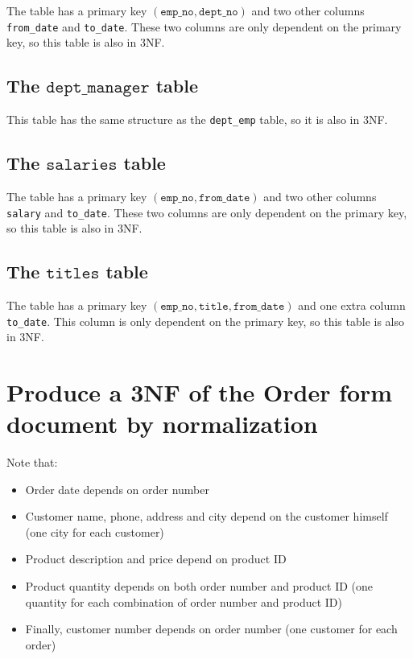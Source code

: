 \documentclass[12pt]{article}
\begin{document}
The table has a primary key $(\texttt{emp\_no}, \texttt{dept\_no})$ and two other columns \verb|from_date| and \verb|to_date|. These two columns are only dependent on the primary key, so this table is also in 3NF.

\subsection{The $\texttt{dept\_manager}$ table}

This table has the same structure as the \verb|dept_emp| table, so it is also in 3NF.

\subsection{The $\texttt{salaries}$ table}

The table has a primary key $(\texttt{emp\_no}, \texttt{from\_date})$ and two other columns \verb|salary| and \verb|to_date|. These two columns are only dependent on the primary key, so this table is also in 3NF.

\subsection{The $\texttt{titles}$ table}

The table has a primary key $(\texttt{emp\_no}, \texttt{title}, \texttt{from\_date})$ and one extra column \verb|to_date|. This column is only dependent on the primary key, so this table is also in 3NF.


\section{Produce a 3NF of the Order form document by normalization}

Note that:
\begin{itemize}
	\item Order date depends on order number
	\item Customer name, phone, address and city depend on the customer himself (one city for each customer)
	\item Product description and price depend on product ID
	\item Product quantity depends on both order number and product ID (one quantity for each combination of order number and product ID)
	\item Finally, customer number depends on order number (one customer for each order)
\end{itemize}
\end{document}
